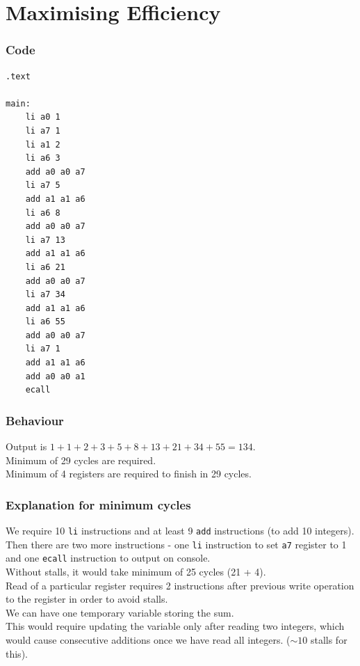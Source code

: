 \documentclass[12pt, fleqn]{article}
\begin{document}
\newpage
\section{Maximising Efficiency}

\subsubsection*{Code}
\begin{verbatim}
.text

main:
    li a0 1
    li a7 1
    li a1 2
    li a6 3
    add a0 a0 a7
    li a7 5
    add a1 a1 a6
    li a6 8
    add a0 a0 a7
    li a7 13
    add a1 a1 a6
    li a6 21
    add a0 a0 a7
    li a7 34
    add a1 a1 a6
    li a6 55
    add a0 a0 a7
    li a7 1
    add a1 a1 a6
    add a0 a0 a1
    ecall
\end{verbatim}

\subsubsection*{Behaviour}
Output is $1+1+2+3+5+8+13+21+34+55 = 134$. \\
Minimum of 29 cycles are required. \\
Minimum of 4 registers are required to finish in 29 cycles.

\subsubsection*{Explanation for minimum cycles}
We require 10 \verb!li! instructions and at least 9 \verb!add! instructions (to add 10 integers). \\
Then there are two more instructions - one \verb!li! instruction to set \verb!a7! register to 1 and one \verb!ecall! instruction to output on console. \\
Without stalls, it would take minimum of 25 cycles (21 + 4). \\

Read of a particular register requires 2 instructions after previous write operation to the register in order to avoid stalls. \\

We can have one temporary variable storing the sum. \\
This would require updating the variable only after reading two integers, which would cause consecutive additions once we have read all integers. ($\sim 10$ stalls for this). \\
\end{document}
